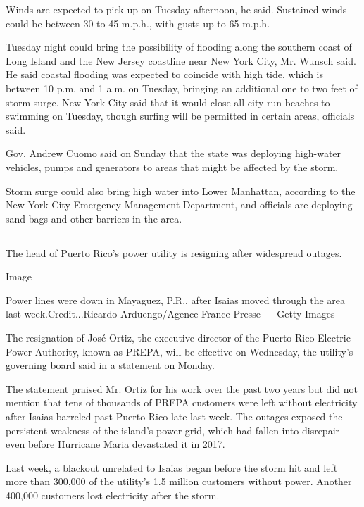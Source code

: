 Winds are expected to pick up on Tuesday afternoon, he said. Sustained
winds could be between 30 to 45 m.p.h., with gusts up to 65 m.p.h.

Tuesday night could bring the possibility of flooding along the southern
coast of Long Island and the New Jersey coastline near New York City,
Mr. Wunsch said. He said coastal flooding was expected to coincide with
high tide, which is between 10 p.m. and 1 a.m. on Tuesday, bringing an
additional one to two feet of storm surge. New York City said that it
would close all city-run beaches to swimming on Tuesday, though surfing
will be permitted in certain areas, officials said.

Gov. Andrew Cuomo said on Sunday that the state was deploying high-water
vehicles, pumps and generators to areas that might be affected by the
storm.

Storm surge could also bring high water into Lower Manhattan, according
to the New York City Emergency Management Department, and officials are
deploying sand bags and other barriers in the area.

\hypertarget{-5}{%
\subsection{}\label{-5}}

The head of Puerto Rico's power utility is resigning after widespread
outages.

Image

Power lines were down in Mayaguez, P.R., after Isaias moved through the
area last week.Credit...Ricardo Arduengo/Agence France-Presse --- Getty
Images

The resignation of José Ortiz, the executive director of the Puerto Rico
Electric Power Authority, known as PREPA, will be effective on
Wednesday, the utility's governing board said in a statement on Monday.

The statement praised Mr. Ortiz for his work over the past two years but
did not mention that tens of thousands of PREPA customers were left
without electricity after Isaias barreled past Puerto Rico late last
week. The outages exposed the persistent weakness of the island's power
grid, which had fallen into disrepair even before Hurricane Maria
devastated it in 2017.

Last week, a blackout unrelated to Isaias began before the storm hit and
left more than 300,000 of the utility's 1.5 million customers without
power. Another 400,000 customers lost electricity after the storm.

